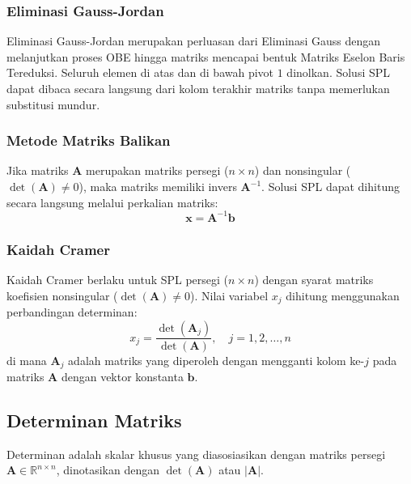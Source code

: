 \documentclass[12pt]{article}
\begin{document}
\begin{enumerate}
\subsubsection{Eliminasi Gauss-Jordan}
Eliminasi Gauss-Jordan merupakan perluasan dari Eliminasi Gauss dengan melanjutkan proses OBE hingga matriks mencapai bentuk Matriks Eselon Baris Tereduksi. Seluruh elemen di atas dan di bawah pivot $1$ dinolkan. Solusi SPL dapat dibaca secara langsung dari kolom terakhir matriks tanpa memerlukan substitusi mundur.

\subsubsection{Metode Matriks Balikan}
Jika matriks $\mathbf{A}$ merupakan matriks persegi ($n \times n$) dan nonsingular ($\det(\mathbf{A}) \neq 0$), maka matriks memiliki invers $\mathbf{A}^{-1}$. Solusi SPL dapat dihitung secara langsung melalui perkalian matriks:
\begin{equation}
    \mathbf{x} = \mathbf{A}^{-1}\mathbf{b}
\end{equation}

\subsubsection{Kaidah Cramer}
Kaidah Cramer berlaku untuk SPL persegi ($n \times n$) dengan syarat matriks koefisien nonsingular ($\det(\mathbf{A}) \neq 0$). Nilai variabel $x_j$ dihitung menggunakan perbandingan determinan:
\begin{equation}
    x_j = \frac{\det(\mathbf{A}_j)}{\det(\mathbf{A})}, \quad j = 1, 2, \dots, n
\end{equation}
di mana $\mathbf{A}_j$ adalah matriks yang diperoleh dengan mengganti kolom ke-$j$ pada matriks $\mathbf{A}$ dengan vektor konstanta $\mathbf{b}$.

\subsection{Determinan Matriks}
Determinan adalah skalar khusus yang diasosiasikan dengan matriks persegi $\mathbf{A} \in \mathbb{R}^{n \times n}$, dinotasikan dengan $\det(\mathbf{A})$ atau $|\mathbf{A}|$.


\end{enumerate}
\end{document}

